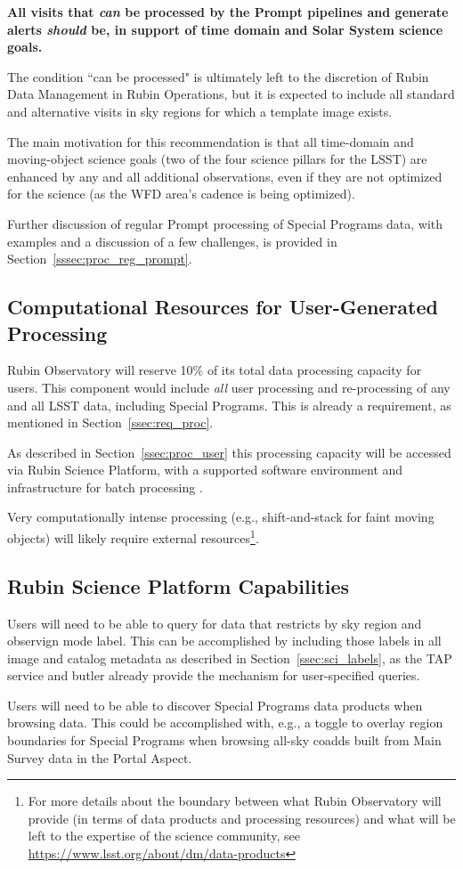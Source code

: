 \textbf{All visits that \emph{can} be processed by the Prompt pipelines and generate 
alerts \emph{should} be, in support of time domain and Solar System science goals.}

The condition ``can be processed" is ultimately left to the discretion of
Rubin Data Management in Rubin Operations, but it is expected to include
all standard and alternative visits in sky regions for which a template image exists.

The main motivation for this recommendation is that all time-domain and 
moving-object science goals (two of the four science pillars for the LSST) are
enhanced by any and all additional observations, even if they are not
optimized for the science (as the WFD area's cadence is being optimized).

Further discussion of regular Prompt processing of Special Programs data, with
examples and a discussion of a few challenges,
is provided in Section~\ref{sssec:proc_reg_prompt}.

\subsection{Computational Resources for User-Generated Processing}\label{ssec:sci_comp}

Rubin Observatory will reserve 10\% of its total data processing capacity for users.
This component would include {\it all} user processing and re-processing of any and 
all LSST data, including Special Programs. 
This is already a requirement, as mentioned in Section~\ref{ssec:req_proc}.

As described in Section~\ref{ssec:proc_user} this processing capacity will be 
accessed via Rubin Science Platform, with a supported software environment and 
infrastructure for batch processing .

Very computationally intense processing (e.g., shift-and-stack for faint moving 
objects) will likely require external resources\footnote{For more details about 
the boundary between what Rubin Observatory will provide (in terms of data products 
and processing resources) and what will be left to the expertise of the science community, 
see \url{https://www.lsst.org/about/dm/data-products}}.

\subsection{Rubin Science Platform Capabilities}\label{ssec:sci_rsp}

Users will need to be able to query for data that restricts by sky region and 
observign mode label. 
This can be accomplished by including those labels in all image and catalog 
metadata as described in Section~\ref{ssec:sci_labels}, as the TAP service 
and butler already provide the mechanism for user-specified queries.

Users will need to be able to discover Special Programs data products when 
browsing data.
This could be accomplished with, e.g., a toggle to overlay region boundaries
for Special Programs when browsing all-sky coadds built from Main Survey data
in the Portal Aspect.


